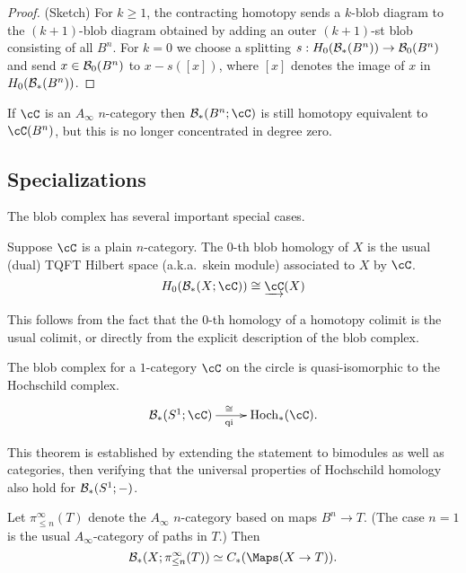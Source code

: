 \documentclass{pnastwo}
\begin{document}
\begin{article}
\begin{proof}(Sketch)
For $k\ge 1$, the contracting homotopy sends a $k$-blob diagram to the $(k{+}1)$-blob diagram
obtained by adding an outer $(k{+}1)$-st blob consisting of all $B^n$.
For $k=0$ we choose a splitting $s: H_0({\mathcal B}_*(B^n)) \to {\mathcal B}_0(B^n)$ and send 
$x\in {\mathcal B}_0(B^n)$ to $x - s([x])$, where $[x]$ denotes the image of $x$ in $H_0({\mathcal B}_*(B^n))$.
\end{proof}

If $\cC$ is an $A_\infty$ $n$-category then $\bc_*(B^n;\cC)$ is still homotopy equivalent to $\cC(B^n)$,
but this is no longer concentrated in degree zero.

\subsection{Specializations}
\label{sec:specializations}

The blob complex has several important special cases.

\begin{thm}
\label{thm:skein-modules}
Suppose $\cC$ is a plain $n$-category.
The $0$-th blob homology of $X$ is the usual 
(dual) TQFT Hilbert space (a.k.a.\ skein module) associated to $X$
by $\cC$.
\begin{equation*}
H_0(\bc_*(X;\cC)) \iso \cl{\cC}(X)
\end{equation*}
\end{thm}
This follows from the fact that the $0$-th homology of a homotopy colimit is the usual colimit, 
or directly from the explicit description of the blob complex.

\begin{thm}[Hochschild homology when $X=S^1$]
\label{thm:hochschild}
The blob complex for a $1$-category $\cC$ on the circle is
quasi-isomorphic to the Hochschild complex.
\begin{equation*}
\xymatrix{\bc_*(S^1;\cC) \ar[r]^(0.47){\iso}_(0.47){\text{qi}} & \HC_*(\cC).}
\end{equation*}
\end{thm}
This theorem is established by extending the statement to bimodules as well as categories, 
then verifying that the universal properties of Hochschild homology also hold for ${\mathcal B}_*(S^1; -)$.

\begin{thm}
\label{thm:map-recon}
Let $\pi^\infty_{\le n}(T)$ denote the $A_\infty$ $n$-category based on maps 
$B^n \to T$.
(The case $n=1$ is the usual $A_\infty$-category of paths in $T$.)
Then 
$$\bc_*(X; \pi^\infty_{\le n}(T)) \simeq \CM{X}{T}.$$
\end{thm}


\end{article}
\end{document}
